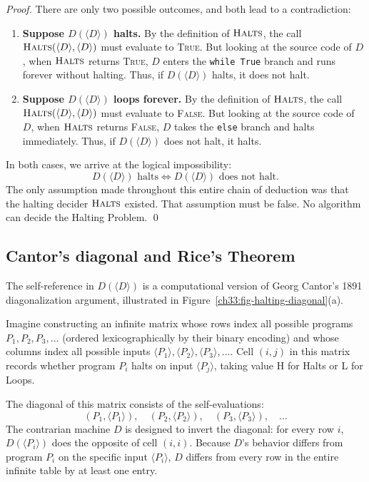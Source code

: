 \begin{proof}
There are only two possible outcomes, and both lead to a contradiction:
\begin{enumerate}
  \item \textbf{Suppose $D(\langle D \rangle)$ halts.}
        By the definition of $\textsc{Halts}$, the call $\textsc{Halts}(\langle D \rangle, \langle D \rangle)$ must evaluate to \textsc{True}. But looking at the source code of $D$, when $\textsc{Halts}$ returns \textsc{True}, $D$ enters the \lstinline|while True| branch and runs forever without halting. Thus, if $D(\langle D \rangle)$ halts, it does not halt.
  \item \textbf{Suppose $D(\langle D \rangle)$ loops forever.}
        By the definition of $\textsc{Halts}$, the call $\textsc{Halts}(\langle D \rangle, \langle D \rangle)$ must evaluate to \textsc{False}. But looking at the source code of $D$, when $\textsc{Halts}$ returns \textsc{False}, $D$ takes the \lstinline|else| branch and halts immediately. Thus, if $D(\langle D \rangle)$ does not halt, it halts.
\end{enumerate}
In both cases, we arrive at the logical impossibility:
\[
  D(\langle D \rangle) \text{ halts} \iff D(\langle D \rangle) \text{ does not halt}.
\]
The only assumption made throughout this entire chain of deduction was that the halting decider $\textsc{Halts}$ existed. That assumption must be false. No algorithm can decide the Halting Problem. \qed
\end{proof}

\subsection{Cantor's diagonal and Rice's Theorem}

The self-reference in $D(\langle D \rangle)$ is a computational version of Georg Cantor's 1891 diagonalization argument, illustrated in Figure~\ref{ch33:fig-halting-diagonal}(a).

Imagine constructing an infinite matrix whose rows index all possible programs $P_1, P_2, P_3, \dots$ (ordered lexicographically by their binary encoding) and whose columns index all possible inputs $\langle P_1 \rangle, \langle P_2 \rangle, \langle P_3 \rangle, \dots$. Cell $(i, j)$ in this matrix records whether program $P_i$ halts on input $\langle P_j \rangle$, taking value \textsc{H} for Halts or \textsc{L} for Loops.

The diagonal of this matrix consists of the self-evaluations:
\[
  (P_1, \langle P_1 \rangle), \quad (P_2, \langle P_2 \rangle), \quad (P_3, \langle P_3 \rangle), \quad \dots
\]
The contrarian machine $D$ is designed to invert the diagonal: for every row $i$, $D(\langle P_i \rangle)$ does the opposite of cell $(i, i)$. Because $D$'s behavior differs from program $P_i$ on the specific input $\langle P_i \rangle$, $D$ differs from every row in the entire infinite table by at least one entry.

